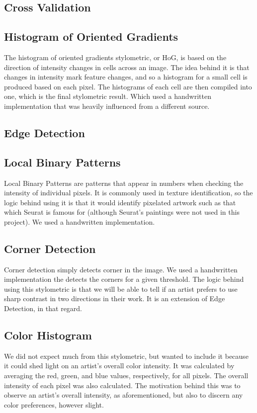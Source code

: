 \documentclass[twocolumn]{article}
\begin{document}
  \subsection{Cross Validation}

  \subsection{Histogram of Oriented Gradients}
  The histogram of oriented gradients stylometric, or HoG, is based on the
  direction of intensity changes in cells across an image. The idea behind it is
  that changes in intensity mark feature changes, and so a histogram for a small
  cell is produced based on each pixel. The histograms of each cell are then
  compiled into one, which is the final stylometric result. Which used a
  handwritten implementation that was heavily influenced from a different
  source.

  \subsection{Edge Detection}

  \subsection{Local Binary Patterns}
  Local Binary Patterns are patterns that appear in numbers when checking the
  intensity of individual pixels. It is commonly used in texture identification,
  so the logic behind using it is that it would identify pixelated artwork such
  as that which Seurat is famous for (although Seurat's paintings were not used
  in this project). We used a handwritten implementation.

  \subsection{Corner Detection}
  Corner detection simply detects corner in the image. We used a handwritten
  implementation the detects the corners for a given threshold. The logic behind
  using this stylometric is that we will be able to tell if an artist prefers to
  use sharp contrast in two directions in their work. It is an extension of Edge
  Detection, in that regard. \\

  \subsection{Color Histogram}
  We did not expect much from this stylometric, but wanted to include it because
  it could shed light on an artist's overall color intensity. It was calculated
  by averaging the red, green, and blue values, respectively, for all pixels.
  The overall intensity of each pixel was also calculated. The motivation behind
  this was to observe an artist's overall intensity, as aforementioned, but also
  to discern any color preferences, however slight. \\
\end{document}
